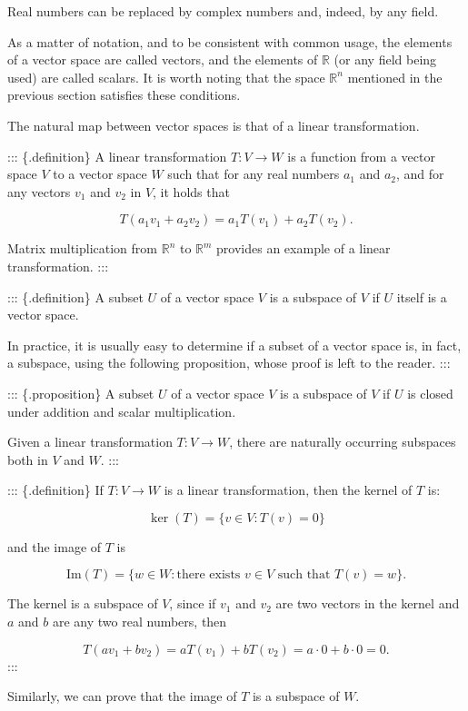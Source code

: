 \documentclass[
]{book}
\theoremstyle{definition}
\theoremstyle{definition}
\theoremstyle{definition}
\theoremstyle{definition}
\theoremstyle{remark}
\begin{document}
Real numbers can be replaced by complex numbers and, indeed, by any field.

As a matter of notation, and to be consistent with common usage, the elements of a vector space are called vectors, and the elements of \(\mathbb{R}\) (or any field being used) are called scalars. It is worth noting that the space \(\mathbb{R}^n\) mentioned in the previous section satisfies these conditions.

The natural map between vector spaces is that of a linear transformation.

::: \{.definition\} A linear transformation \(T : V \to W\) is a function from a vector space \(V\) to a vector space \(W\) such that for any real numbers \(a_1\) and \(a_2\), and for any vectors \(v_1\) and \(v_2\) in \(V\), it holds that

\[
T(a_1 v_1 + a_2 v_2) = a_1 T(v_1) + a_2 T(v_2).
\]

Matrix multiplication from \(\mathbb{R}^n\) to \(\mathbb{R}^m\) provides an example of a linear transformation.
:::

::: \{.definition\} A subset \(U\) of a vector space \(V\) is a subspace of \(V\) if \(U\) itself is a vector space.

In practice, it is usually easy to determine if a subset of a vector space is, in fact, a subspace, using the following proposition, whose proof is left to the reader.
:::

::: \{.proposition\} A subset \(U\) of a vector space \(V\) is a subspace of \(V\) if \(U\) is closed under addition and scalar multiplication.

Given a linear transformation \(T : V \to W\), there are naturally occurring subspaces both in \(V\) and \(W\).
:::

::: \{.definition\} If \(T : V \to W\) is a linear transformation, then the kernel of \(T\) is:

\[
\ker(T) = \{ v \in V : T(v) = 0 \}
\]

and the image of \(T\) is

\[
\text{Im}(T) = \{ w \in W : \text{there exists } v \in V \text{ such that } T(v) = w \}.
\]

The kernel is a subspace of \(V\), since if \(v_1\) and \(v_2\) are two vectors in the kernel and \(a\) and \(b\) are any two real numbers, then

\[
T(a v_1 + b v_2) = a T(v_1) + b T(v_2) = a \cdot 0 + b \cdot 0 = 0.
\]
:::

Similarly, we can prove that the image of \(T\) is a subspace of \(W\).
\end{document}

